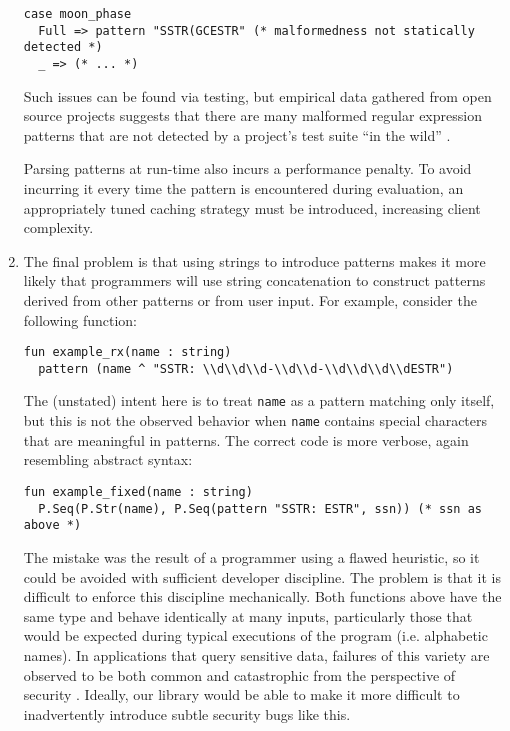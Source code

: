 \begin{enumerate}
\begin{lstlisting}[numbers=none]
case moon_phase
  Full => pattern "SSTR(GCESTR" (* malformedness not statically detected *)
  _ => (* ... *)
\end{lstlisting}
Such issues can be found via testing, but empirical data gathered from open source projects suggests that there are many malformed regular expression patterns that are not detected by a project's test suite ``in the wild'' \cite{spishak2012type}. 

Parsing patterns at run-time also incurs a performance penalty. To avoid incurring it every time the pattern is encountered during evaluation, an appropriately tuned caching strategy must be introduced, increasing client complexity.%

\item The final problem is that using strings to introduce patterns makes it more likely that programmers will use string concatenation to construct patterns derived from other patterns or from user input. For example, consider the following function:
\begin{lstlisting}[numbers=none,escapechar=|]
fun example_rx(name : string)
  pattern (name ^ "SSTR: \\d\\d\\d-\\d\\d-\\d\\d\\d\\dESTR")
\end{lstlisting}
The (unstated) intent here is to treat \lstinline{name} as a pattern matching only itself, but this is not the observed behavior when \lstinline{name} contains special characters that are meaningful in patterns. The correct code is more verbose, again resembling abstract syntax: 
\begin{lstlisting}[numbers=none]
fun example_fixed(name : string)
  P.Seq(P.Str(name), P.Seq(pattern "SSTR: ESTR", ssn)) (* ssn as above *)
\end{lstlisting}

The mistake was the result of a programmer using a flawed heuristic, so it could be avoided with sufficient developer discipline. 
The problem is that it is difficult to enforce this discipline mechanically. Both functions above have the same type and behave identically at many inputs, particularly those that would be expected during typical executions of the program (i.e. alphabetic names). In applications that query sensitive data, failures of this variety are observed to be both common and catastrophic from the perspective of security \cite{owasp2013}. Ideally, our library would be able to make it more difficult to inadvertently introduce subtle security bugs like this.
\end{enumerate}

